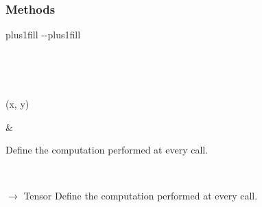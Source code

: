 \documentclass[letterpaper,10pt,english]{sphinxmanual}
\begin{document}
\begin{fulllineitems}
\begin{itemize}
\end{itemize}
\subsubsection*{Methods}


\begin{savenotes}
\sphinxatlongtablestart
\sphinxthistablewithglobalstyle
\sphinxthistablewithnovlinesstyle
\makeatletter
  \LTleft \@totalleftmargin plus1fill
  \LTright\dimexpr\columnwidth-\@totalleftmargin-\linewidth\relax plus1fill
\makeatother
\begin{longtable}{}
\sphinxtoprule
\endfirsthead

\\
\sphinxtoprule
\endhead

\sphinxbottomrule
{}\\
\endfoot

\endlastfoot
\sphinxtableatstartofbodyhook
\begin{varwidth}[t]{}
\sphinxAtStartPar
{\hyperref[\detokenize{dtw_loss_functions.soft_dtw_implementations.soft_dtw_cuda_ron:dtw_loss_functions.soft_dtw_implementations.soft_dtw_cuda_ron.SoftDTW.forward}]{}}(x, y)
\sphinxbeforeendvarwidth
\end{varwidth}%
&\begin{varwidth}[t]{}
\sphinxAtStartPar
Define the computation performed at every call.
\sphinxbeforeendvarwidth
\end{varwidth}%
\\
\sphinxbottomrule
\end{longtable}
\sphinxtableafterendhook
\sphinxatlongtableend
\end{savenotes}

\begin{fulllineitems}
\label{\detokenize{dtw_loss_functions.soft_dtw_implementations.soft_dtw_cuda_ron:dtw_loss_functions.soft_dtw_implementations.soft_dtw_cuda_ron.SoftDTW.forward}}
\pysigstartsignatures
\pysiglinewithargsret
{}
{\sphinxparamcomma {}}
{{ $\rightarrow$ Tensor}}
\pysigstopsignatures
\sphinxAtStartPar
Define the computation performed at every call.


\end{fulllineitems}
\end{fulllineitems}
\end{document}
